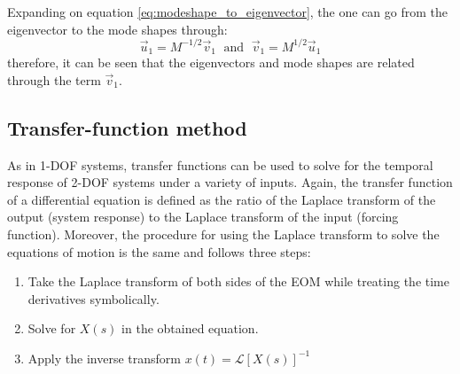 \documentclass[12pt,letter]{article}
\numberwithin{ex}{section} %
\numberwithin{re}{section} %
\newcommand{\Laplace}[1]{\ensuremath{\mathcal{L}{\left[#1\right]}}}
\begin{document}
Expanding on equation \ref{eq:modeshape_to_eigenvector}, the one can go from the eigenvector to the mode shapes through:
\begin{equation}
\vec{u}_1 = M^{-1/2}\vec{v}_1 \; \text{ and } \; \vec{v}_1 = M^{1/2}\vec{u}_1
\end{equation}
therefore, it can be seen that the eigenvectors and mode shapes are related through the term $\vec{v}_1$. 








\subsection{Transfer-function method}

As in 1-DOF systems, transfer functions can be used to solve for the temporal response of 2-DOF systems under a variety of inputs. Again, the transfer function of a differential equation is defined as the ratio of the Laplace transform of the output (system response) to the Laplace transform of the input (forcing function). Moreover, the procedure for using the Laplace transform to solve the equations of motion is the same and follows three steps:
\begin{enumerate}
	\item Take the Laplace transform of both sides of the EOM while treating the time derivatives symbolically.
	\item Solve for $X(s)$ in the obtained equation.
	\item Apply the inverse transform $x(t) = \Laplace{X(s)}^{-1}$
\end{enumerate}
\end{document}
